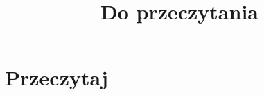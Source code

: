 \documentclass[a4paper,11pt]{article}
\title{Do przeczytania}
\begin{document}





\maketitle  %





\section{Przeczytaj}

\vspace{\spaceTwo}
\end{document}
